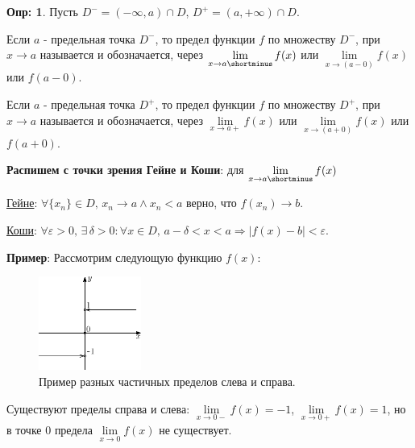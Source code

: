\documentclass[12pt]{article}
\theoremstyle{definition}
\newtheorem{defn}{Опр:}
\begin{document}
\begin{defn}
	Пусть $D^- = (-\infty, a) \cap D$, $D^+ = (a, +\infty) \cap D$. 
	
	Если $a$ - предельная точка $D^-$, то предел функции $f$ по множеству $D^-$, при $x \to a$ называется  и обозначается, через $\lim\limits_{x \to a\shortminus} f(x)$ или $\lim\limits_{x \to (a-0)}f(x)$ или $f(a-0)$.
	
	Если $a$ - предельная точка $D^+$, то предел функции $f$ по множеству $D^+$, при $x \to a$ называется  и обозначается, через $\lim\limits_{x \to a+} f(x)$ или $\lim\limits_{x \to (a+0)}f(x)$ или $f(a+0)$.
\end{defn}

\textbf{Распишем с точки зрения Гейне и Коши}: для $\lim\limits_{x \to a\shortminus}f(x)$

\uline{Гейне}: $\forall \{x_n\} \in D, \, x_n \to a \wedge x_n < a$ верно, что $f(x_n) \to b$.

\uline{Коши}: $\forall \varepsilon > 0,\, \exists \, \delta > 0 \colon \forall x \in D,\, a -\delta < x < a \Rightarrow |f(x) - b| <\varepsilon$.

\textbf{Пример}: Рассмотрим следующую функцию $f(x)$:
\begin{figure}[H]
	\centering
	\includegraphics[width=0.30\textwidth]{15_5.eps}
	\caption{Пример разных частичных пределов слева и справа.}
	\label{15_5}
\end{figure}

Существуют пределы справа и слева: $\lim\limits_{x \to 0-}f(x) = -1$, $\lim\limits_{x \to 0+}f(x) = 1$, но в точке $0$ предела $\lim\limits_{x \to 0}f(x)$ не существует.
\end{document}
